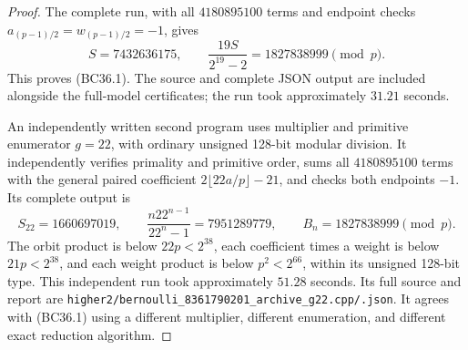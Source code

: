 \begin{proof}
The complete run, with all $4180895100$ terms and endpoint checks
$a_{(p-1)/2}=w_{(p-1)/2}=-1$, gives
\[
                     S=7432636175,\qquad
                     \frac{19S}{2^{19}-2}=1827838999\pmod p.
\]
This proves (BC36.1). The source and complete JSON output are included
alongside the full-model certificates; the run took approximately
$31.21$ seconds.

An independently written second program uses multiplier and primitive
enumerator $g=22$, with ordinary unsigned 128-bit modular division.
It independently verifies primality and primitive order, sums all
$4180895100$ terms with the general paired coefficient
$2\lfloor22a/p\rfloor-21$, and checks both endpoints $-1$.
Its complete output is
\[
 S_{22}=1660697019,\qquad
 \frac{n22^{n-1}}{22^n-1}=7951289779,\qquad
 B_n=1827838999\pmod p.
\]
The orbit product is below $22p<2^{38}$, each coefficient times a
weight is below $21p<2^{38}$, and each weight product is below
$p^2<2^{66}$, within its unsigned 128-bit type.
This independent run took approximately $51.28$ seconds.
Its full source and report are
\texttt{higher2/bernoulli\_8361790201\_archive\_g22.cpp/.json}.
It agrees with (BC36.1) using a different multiplier, different
enumeration, and different exact reduction algorithm.
\end{proof}
